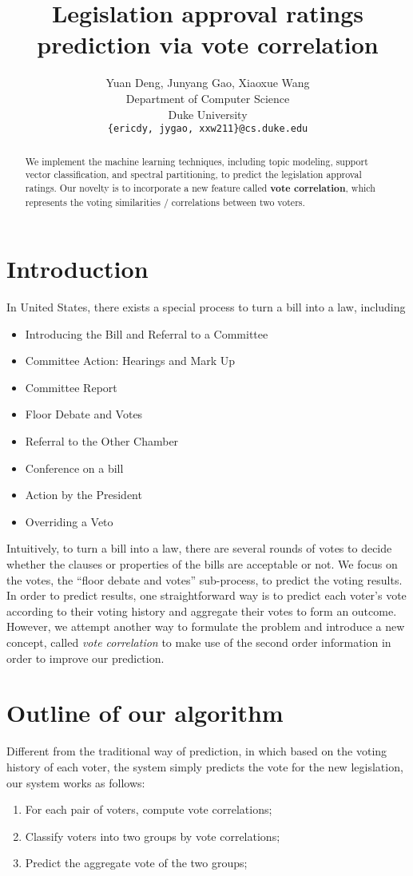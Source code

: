 \documentclass{article} %
\title{Legislation approval ratings prediction via vote correlation}
\author{
Yuan Deng, Junyang Gao, Xiaoxue Wang \\
Department of Computer Science\\
Duke University\\
\texttt{\{ericdy, jygao, xxw211\}@cs.duke.edu} \\
}
\begin{document}
\maketitle

\begin{abstract}
We implement the machine learning techniques, including topic modeling, support vector classification, and spectral partitioning, to predict the legislation approval ratings. Our novelty is to incorporate a new feature called \textbf{vote correlation}, which represents the voting similarities / correlations between two voters. 
\end{abstract}

\section{Introduction}
    In United States, there exists a special process to turn a bill into a law, including\cite{billToLaw}
    \begin{itemize}
        \item Introducing the Bill and Referral to a Committee
        \item Committee Action: Hearings and Mark Up
        \item Committee Report
        \item Floor Debate and Votes
        \item Referral to the Other Chamber
        \item Conference on a bill
        \item Action by the President
        \item Overriding a Veto
    \end{itemize}
    Intuitively, to turn a bill into a law, there are several rounds of votes to decide whether the clauses or properties of the bills are acceptable or not. We focus on the votes, the ``floor debate and votes'' sub-process, to predict the voting results. In order to predict results, one straightforward way is to predict each voter's vote according to their voting history and aggregate their votes to form an outcome. However, we attempt another way to formulate the problem and introduce a new concept, called {\em vote correlation} to make use of the second order information in order to improve our prediction.
    
\section{Outline of our algorithm}
Different from the traditional way of prediction, in which based on the voting history of each voter, the system simply predicts the vote for the new legislation, our system works as follows:     
    \begin{enumerate}         
        \item For each pair of voters, compute vote correlations;
        \item Classify voters into two groups by vote correlations;
        \item Predict the aggregate vote of the two groups;
    \end{enumerate}
    
\end{document}
